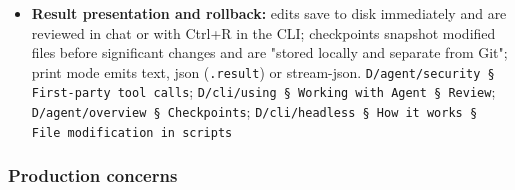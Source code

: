 \begin{itemize}
\item \textbf{Result presentation and rollback:} edits save to disk immediately and are reviewed in chat or with Ctrl+R in the CLI; checkpoints snapshot modified files before significant changes and are "stored locally and separate from Git"; print mode emits text, json (\texttt{.\allowbreak{}result}) or stream-json. \texttt{D/\allowbreak{}agent/\allowbreak{}security § First-\allowbreak{}party tool calls}; \texttt{D/\allowbreak{}cli/\allowbreak{}using § Working with Agent § Review}; \texttt{D/\allowbreak{}agent/\allowbreak{}overview § Checkpoints}; \texttt{D/\allowbreak{}cli/\allowbreak{}headless § How it works § File modification in scripts}
\end{itemize}

\subsubsection*{Production concerns}

